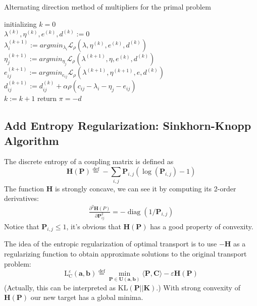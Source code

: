 \documentclass{article}
\begin{document}
\begin{large}
\begin{algorithm}[H]
  \SetAlgoNoLine
  \caption{Alternating direction method of multipliers for the primal problem} 
  initializing $k = 0$\\
  $\lambda^{(k)},\eta^{(k)},e^{(k)},d^{(k)}:=0$\\
  {  
   $\lambda^{(k+1)}_{i}:=argmin_{\lambda_{i}}\mathcal{L}_{\rho}(\lambda,\eta^{(k)},e^{(k)},d^{(k)})$\\
   $\eta^{(k+1)}_{j}:=argmin_{\eta_{j}}\mathcal{L}_{\rho}(\lambda^{(k+1)},\eta,e^{(k)},d^{(k)})$\\
   $e^{(k+1)}_{ij}:=argmin_{e_{ij}}\mathcal{L}_{\rho}(\lambda^{(k+1)},\eta^{(k+1)},e,d^{(k)})$\\
   $d^{(k+1)}_{ij}:=d^{(k)}_{ij}+\alpha\rho(c_{ij}-\lambda_{i}-\eta_{j}-e_{ij})$\\
   $k:= k+1$
  }
  return $\pi=-d$
\end{algorithm}
\subsection{Add Entropy Regularization: Sinkhorn-Knopp Algorithm}
The discrete entropy of a coupling matrix is defined as
\begin{equation}
\mathbf { H } ( \mathbf { P } ) \stackrel { \mathrm { def } } { = } - \sum _ { i , j } \mathbf { P } _ { i , j } \left( \log \left( \mathbf { P } _ { i , j } \right) - 1 \right)
\end{equation}
The function $\mathbf{H}$ is strongly concave, we can see it by computing its 2-order derivatives:
\begin{align}
\frac{\partial ^ { 2 } \mathbf { H } ( P )}{\partial \mathbf{P}_{ij}^2} = - \operatorname { diag } \left( 1 / \mathbf { P } _ { i , j } \right)  
\end{align}
Notice that $\mathbf { P } _ { i , j } \leq 1$, it's obvious that $\mathbf { H } ( \mathbf { P } ) $ has a good property of convexity.

The idea of the entropic regularization of optimal transport is to use $-\mathbf{H}$ as a regularizing function to obtain approximate solutions to the original transport problem:
\begin{equation}
\mathrm { L } _ { \mathrm { C } } ^ { \varepsilon } ( \mathbf { a } , \mathbf { b } ) \stackrel { \mathrm { def } } { = } \min _ { \mathbf { P } \in \mathbf { U } ( \mathbf { a } , \mathbf { b } ) } \langle \mathbf { P } , \mathbf { C } \rangle - \varepsilon \mathbf { H } ( \mathbf { P } )
\label{sinkhorn target}
\end{equation}
(Actually, this can be interpreted as $\text{KL}(\mathbf{P}||\mathbf{K})$.)
With strong convexity of $\mathbf { H  ( P )}$ our new target has a global minima.


\end{large}
\end{document}
